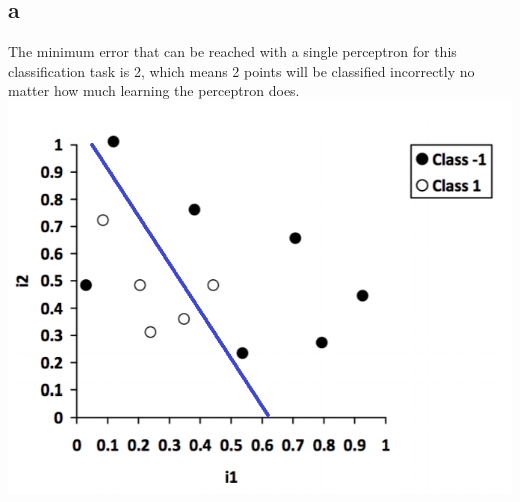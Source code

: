 \documentclass[11pt, oneside]{article}   	%
\begin{document}
\begin{flushleft}
\subsection*{a}
The minimum error that can be reached with a single perceptron for this classification task is 2, which means 2 points will be classified incorrectly no matter how much learning the perceptron does.\\
\includegraphics[]{q5_line_1.png} \\

\end{flushleft}
\end{document}
